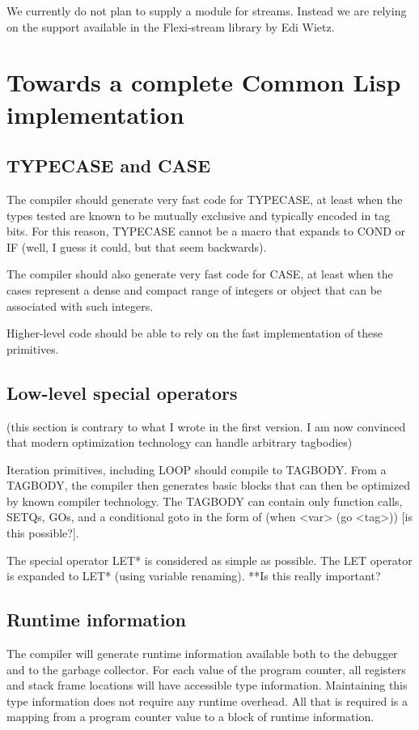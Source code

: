 \documentclass{article}
\begin{document}
We currently do not plan to supply a module for streams.  Instead we
are relying on the support available in the Flexi-stream library by
Edi Wietz.

\section{Towards a complete Common Lisp implementation}

\subsection{TYPECASE and CASE}

The compiler should generate very fast code for TYPECASE, at least
when the types tested are known to be mutually exclusive and typically
encoded in tag bits.  For this reason, TYPECASE cannot be a macro that
expands to COND or IF (well, I guess it could, but that seem backwards).

The compiler should also generate very fast code for CASE, at least
when the cases represent a dense and compact range of integers or
object that can be associated with such integers.

Higher-level code should be able to rely on the fast implementation of
these primitives. 

\subsection{Low-level special operators}

(this section is contrary to what I wrote in the first version.  I am
now convinced that modern optimization technology can handle arbitrary
tagbodies)

Iteration primitives, including LOOP should compile to TAGBODY.  From
a TAGBODY, the compiler then generates basic blocks that can then be
optimized by known compiler technology.  The TAGBODY can contain only
function calls, SETQs, GOs, and a conditional goto in the form of
(when <var> (go <tag>)) [is this possible?].

The special operator LET* is considered as simple as possible.  The
LET operator is expanded to LET* (using variable renaming).  **Is this
really important?

\subsection{Runtime information}

The compiler will generate runtime information available both to the
debugger and to the garbage collector.  For each value of the program
counter, all registers and stack frame locations will have accessible
type information.  Maintaining this type information does not require
any runtime overhead.  All that is required is a mapping from a
program counter value to a block of runtime information. 
\end{document}

